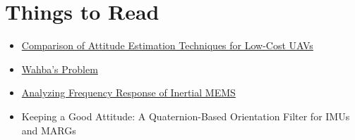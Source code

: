 \documentclass[a4paper]{article}
\begin{document}
\section*{Things to Read}
\begin{itemize}
  \item \href{https://arxiv.org/pdf/1602.07733.pdf}{Comparison of Attitude Estimation Techniques for Low-Cost UAVs}
  \item \href{https://en.wikipedia.org/wiki/Wahba%27s_problem}{Wahba's Problem}
  \item \href{https://www.analog.com/media/en/analog-dialogue/volume-46/number-3/articles/analyzing-frequency-response-of-inertial-mems.pdf}{Analyzing Frequency Response of Inertial MEMS}
  \item Keeping a Good Attitude: A Quaternion-Based Orientation Filter for IMUs and MARGs
\end{itemize}



\end{document}
